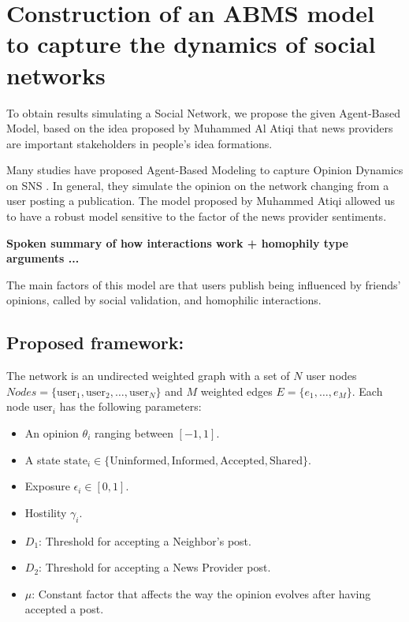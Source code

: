 \documentclass[12pt]{report} %
\begin{document}
\chapter{Construction of an ABMS model to capture the dynamics of social networks}

To obtain results simulating a Social Network, we propose the given Agent-Based Model, based on the idea proposed by Muhammed Al Atiqi \cite{atiqi} that news providers are important stakeholders in people’s idea formations.

Many studies have proposed Agent-Based Modeling to capture Opinion Dynamics on SNS \cite{sns}. In general, they simulate the opinion on the network changing from a user posting a publication. The model proposed by Muhammed Atiqi allowed us to have a robust model sensitive to the factor of the news provider sentiments.

\textbf{Spoken summary of how interactions work + homophily type arguments ...}

The main factors of this model are that users publish being influenced by friends’ opinions, called by \cite{atiqi} social validation, and homophilic interactions.

\section{Proposed framework:}

The network is an undirected weighted graph with a set of $N$ user nodes $Nodes = \{ \text{user}_1, \text{user}_2, \ldots, \text{user}_N \}$ and $M$ weighted edges $E = \{ e_1, \ldots, e_M \}$. Each node $\text{user}_i$ has the following parameters:
\begin{itemize}
    \item An opinion $\theta_i$ ranging between $[-1, 1]$.
    \item A state $\text{state}_i \in \{\text{Uninformed}, \text{Informed}, \text{Accepted}, \text{Shared}\}$.
    \item Exposure $\epsilon_i \in [0,1]$.
    \item Hostility $\gamma_i$.
    \item $D_1$: Threshold for accepting a Neighbor’s post.
    \item $D_2$: Threshold for accepting a News Provider post.
    \item $\mu$: Constant factor that affects the way the opinion evolves after having accepted a post.
\end{itemize}
\end{document}
